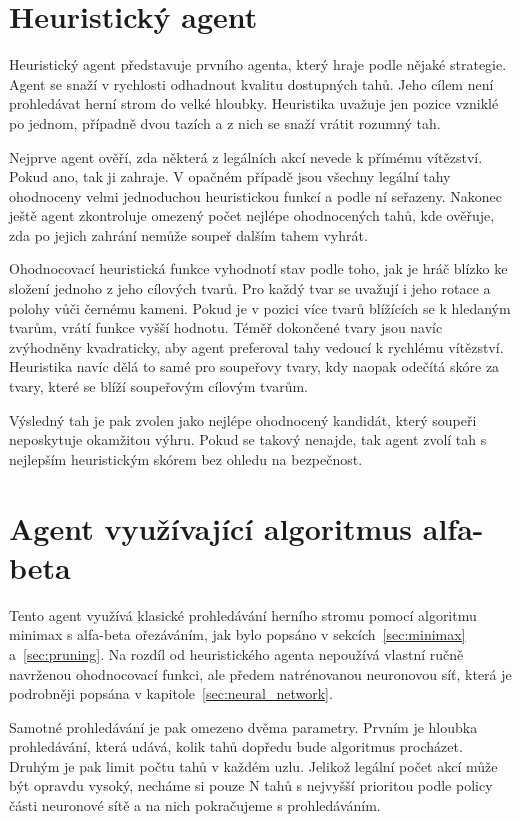 \section{Heuristický agent}

Heuristický agent představuje prvního agenta, který hraje podle nějaké strategie. Agent se snaží v rychlosti odhadnout kvalitu dostupných tahů. Jeho 
cílem není prohledávat herní strom do velké hloubky. Heuristika uvažuje jen pozice vzniklé po jednom, případně dvou tazích a z nich se snaží vrátit 
rozumný tah.

Nejprve agent ověří, zda některá z legálních akcí nevede k přímému vítězství. Pokud ano, tak ji zahraje. V opačném případě jsou všechny legální tahy ohodnoceny
velmi jednoduchou heuristickou funkcí a podle ní seřazeny. Nakonec ještě agent zkontroluje omezený počet nejlépe ohodnocených tahů, kde ověřuje, zda po jejich
zahrání nemůže soupeř dalším tahem vyhrát.

Ohodnocovací heuristická funkce vyhodnotí stav podle toho, jak je hráč blízko ke složení jednoho z jeho cílových tvarů. Pro každý tvar se uvažují i jeho rotace a 
polohy vůči černému kameni. Pokud je v pozici více tvarů blížících se k hledaným tvarům, vrátí funkce vyšší hodnotu. Téměř dokončené tvary jsou navíc zvýhodněny
kvadraticky, aby agent preferoval tahy vedoucí k rychlému vítězství. Heuristika navíc dělá to samé pro soupeřovy tvary, kdy naopak odečítá skóre za tvary,
které se blíží soupeřovým cílovým tvarům.

Výsledný tah je pak zvolen jako nejlépe ohodnocený kandidát, který soupeři neposkytuje okamžitou výhru. Pokud se takový nenajde, tak agent zvolí tah s nejlepším
heuristickým skórem bez ohledu na bezpečnost.

\section{Agent využívající algoritmus alfa-beta}

Tento agent využívá klasické prohledávání herního stromu pomocí algoritmu minimax s alfa-beta ořezáváním, jak bylo popsáno v sekcích~\ref{sec:minimax} a~\ref{sec:pruning}.
Na rozdíl od heuristického agenta nepoužívá vlastní ručně navrženou ohodnocovací funkci, ale předem natrénovanou neuronovou síť, která je podrobněji popsána
v kapitole~\ref{sec:neural_network}. 

Samotné prohledávání je pak omezeno dvěma parametry. Prvním je hloubka prohledávání, která udává, kolik tahů dopředu bude algoritmus procházet. Druhým je pak 
limit počtu tahů v každém uzlu. Jelikož legální počet akcí může být opravdu vysoký, necháme si pouze N tahů s nejvyšší prioritou podle policy části neuronové sítě
a na nich pokračujeme s prohledáváním.

